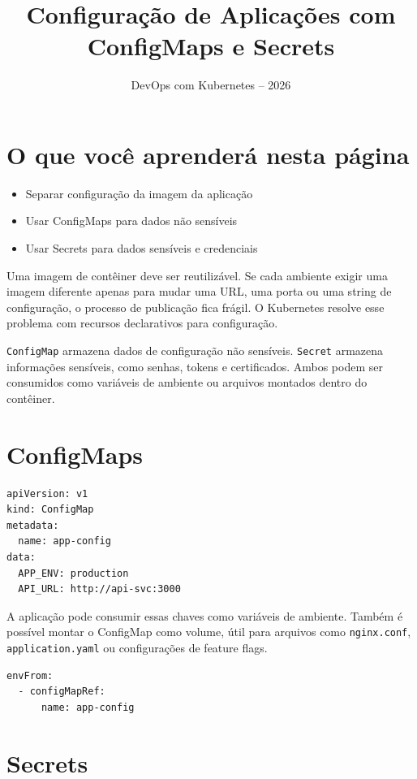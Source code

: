 \documentclass[11pt,a4paper]{article}
\title{\color{secondary}\Huge\textbf{Configuração de Aplicações com ConfigMaps e Secrets}}
\author{\color{primary}DevOps com Kubernetes -- 2026}
\date{}
\begin{document}
\maketitle


\section*{\color{primary}O que você aprenderá nesta página}
\begin{itemize}
\item Separar configuração da imagem da aplicação
\item Usar ConfigMaps para dados não sensíveis
\item Usar Secrets para dados sensíveis e credenciais
\end{itemize}

Uma imagem de contêiner deve ser reutilizável. Se cada ambiente exigir uma imagem diferente apenas para mudar uma URL, uma porta ou uma string de configuração, o processo de publicação fica frágil. O Kubernetes resolve esse problema com recursos declarativos para configuração.

\texttt{ConfigMap} armazena dados de configuração não sensíveis. \texttt{Secret} armazena informações sensíveis, como senhas, tokens e certificados. Ambos podem ser consumidos como variáveis de ambiente ou arquivos montados dentro do contêiner.

\section*{\color{primary}ConfigMaps}

\begin{lstlisting}[language=bash]
apiVersion: v1
kind: ConfigMap
metadata:
  name: app-config
data:
  APP_ENV: production
  API_URL: http://api-svc:3000
\end{lstlisting}

A aplicação pode consumir essas chaves como variáveis de ambiente. Também é possível montar o ConfigMap como volume, útil para arquivos como \texttt{nginx.conf}, \texttt{application.yaml} ou configurações de feature flags.

\begin{lstlisting}[language=bash]
envFrom:
  - configMapRef:
      name: app-config
\end{lstlisting}

\section*{\color{primary}Secrets}
\end{document}
